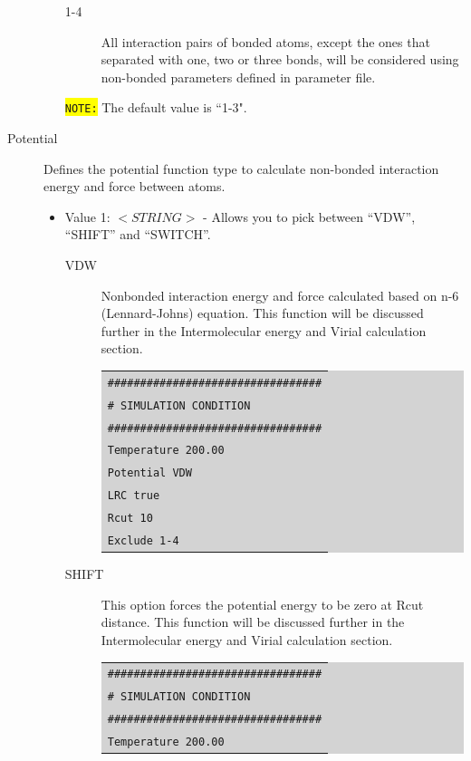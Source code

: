 \begin{description}
\begin{itemize}
\begin{description}
		\item [1-4] All interaction pairs of bonded atoms, except the ones that separated with one, two or three bonds, will be considered using non-bonded parameters defined in parameter file.
		\end{description}
		\colorbox{yellow}{\texttt{NOTE:}} The default value is ``1-3".
	\end{itemize}
\item [Potential] Defines the potential function type to calculate non-bonded interaction energy and force between atoms.
	\begin{itemize}
	\item Value 1: $<STRING>$ - Allows you to pick between ``VDW'', ``SHIFT'' and ``SWITCH''.
		\begin{description}
		\item [VDW] Nonbonded interaction energy and force calculated based on n-6 (Lennard-Johns) equation. This function will be discussed further in the Intermolecular energy and Virial calculation section.\\
		\colorbox{lightgray}{
		\begin{tabular}{l}
		\texttt{\#\#\#\#\#\#\#\#\#\#\#\#\#\#\#\#\#\#\#\#\#\#\#\#\#\#\#\#\#\#\#\#\#}\\
		\texttt{\# SIMULATION CONDITION}\\
		\texttt{\#\#\#\#\#\#\#\#\#\#\#\#\#\#\#\#\#\#\#\#\#\#\#\#\#\#\#\#\#\#\#\#\#}\\
		\texttt{Temperature 200.00}\\
		\texttt{Potential VDW}\\
		\texttt{LRC true}\\
		\texttt{Rcut 10}\\
		\texttt{Exclude 1-4}\\
		\end{tabular}}
		\item [SHIFT] This option forces the potential energy to be zero at Rcut distance. This function will be discussed further in the Intermolecular energy and Virial calculation section.\\
		\colorbox{lightgray}{
		\begin{tabular}{l}
		\texttt{\#\#\#\#\#\#\#\#\#\#\#\#\#\#\#\#\#\#\#\#\#\#\#\#\#\#\#\#\#\#\#\#\#}\\
		\texttt{\# SIMULATION CONDITION}\\
		\texttt{\#\#\#\#\#\#\#\#\#\#\#\#\#\#\#\#\#\#\#\#\#\#\#\#\#\#\#\#\#\#\#\#\#}\\
		\texttt{Temperature 200.00}\\

\end{tabular}}
\end{description}
\end{itemize}
\end{description}
